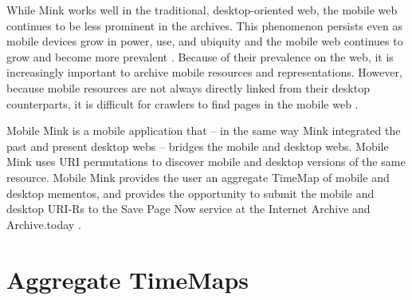 \documentclass{sig-alternate-2013}
\begin{document}
While Mink works well in the traditional, desktop-oriented web, the mobile web continues to be less prominent in the archives. This phenomenon persists even as mobile devices grow in power, use, and ubiquity and the mobile web continues to grow and become more prevalent \cite{mobileWeb}. Because of their prevalence on the web, it is increasingly important to archive mobile resources and representations. However, because mobile resources are not always directly linked from their desktop counterparts, it is difficult for crawlers to find pages in the mobile web \cite{4544648}.

Mobile Mink is a mobile application that -- in the same way Mink integrated the past and present desktop webs -- bridges the mobile and desktop webs. Mobile Mink uses URI permutations to discover mobile and desktop versions of the same resource. Mobile Mink provides the user an aggregate TimeMap of mobile and desktop mementos, and provides the opportunity to submit the mobile and desktop URI-Rs to the Save Page Now service at the Internet Archive \cite{savePage} and Archive.today \cite{archivetoday}.


\section{Aggregate TimeMaps}
\label{timemaps}
\end{document}
